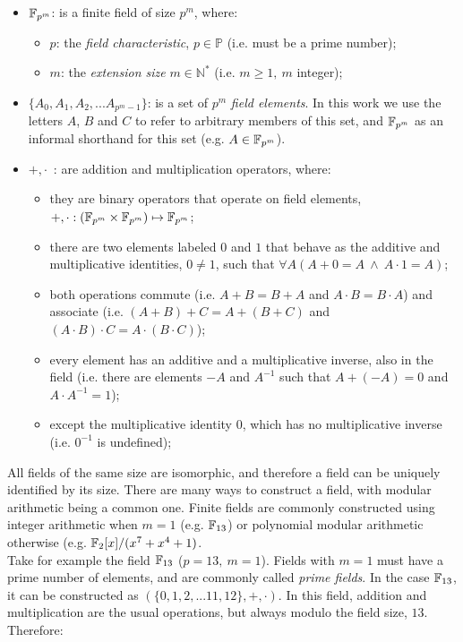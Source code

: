 \begin{itemize}
\item $\mathbb{F}_{p^m}$: is a finite field of size $p^m$, where:
    \begin{itemize}
    \item $p$: the \emph{field characteristic}, $p \in \mathbb{P}$ (i.e. must be a prime number);
    \item $m$: the \emph{extension size} $m \in \mathbb{N^*}$ (i.e. $m \geq 1,~m$ integer);
    \end{itemize}
\item $\{A_0, A_1, A_2, ... A_{p^m-1}\}$: is a set of $p^m$ \emph{field elements}. In this work we use the letters $A$, $B$ and $C$ to refer to arbitrary members of this set, and $\mathbb{F}_{p^m}$ as an informal shorthand for this set (e.g. $A \in \mathbb{F}_{p^m}$).
\item $+, \cdot$~: are addition and multiplication operators, where:
    \begin{itemize}
    \item they are binary operators that operate on field elements, $+, \cdot : (\mathbb{F}_{p^m} \times \mathbb{F}_{p^m}) \mapsto \mathbb{F}_{p^m}$;
    \item there are two elements labeled $0$ and $1$ that behave as the additive and multiplicative identities, $0 \neq 1$, such that $\forall A (A + 0 = A~\wedge~A \cdot 1 = A)$;
    \item both operations commute (i.e. $A + B = B + A$ and $A \cdot B = B \cdot A$) and associate (i.e. $(A + B) + C = A + (B + C)$ and $(A \cdot B) \cdot C = A \cdot (B \cdot C)$);
    \item every element has an additive and a multiplicative inverse, also in the field (i.e. there are elements $-A$ and $A^{-1}$ such that $A + (-A) = 0$ and $A \cdot A^{-1} = 1$);
    \item except the multiplicative identity $0$, which has no multiplicative inverse (i.e. $0^{-1}$ is undefined);
    \end{itemize}
\end{itemize}

All fields of the same size are isomorphic, and therefore a field can be uniquely identified by its size. There are many ways to construct a field, with modular arithmetic being a common one. Finite fields are commonly constructed using integer arithmetic when $m=1$ (e.g. $\mathbb{F}_{13}$) or polynomial modular arithmetic otherwise (e.g. $\mathbb{F}_{2}[x]/(x^7+x^4+1)$.\\

Take for example the field $\mathbb{F}_{13}$ ($p=13,~m=1$). Fields with $m=1$ must have a prime number of elements, and are commonly called \emph{prime fields}. In the case $\mathbb{F}_{13}$, it can be constructed as $(\{0, 1, 2, ... 11, 12\}, +, \cdot)$. In this field, addition and multiplication are the usual operations, but always modulo the field size, $13$. Therefore:

